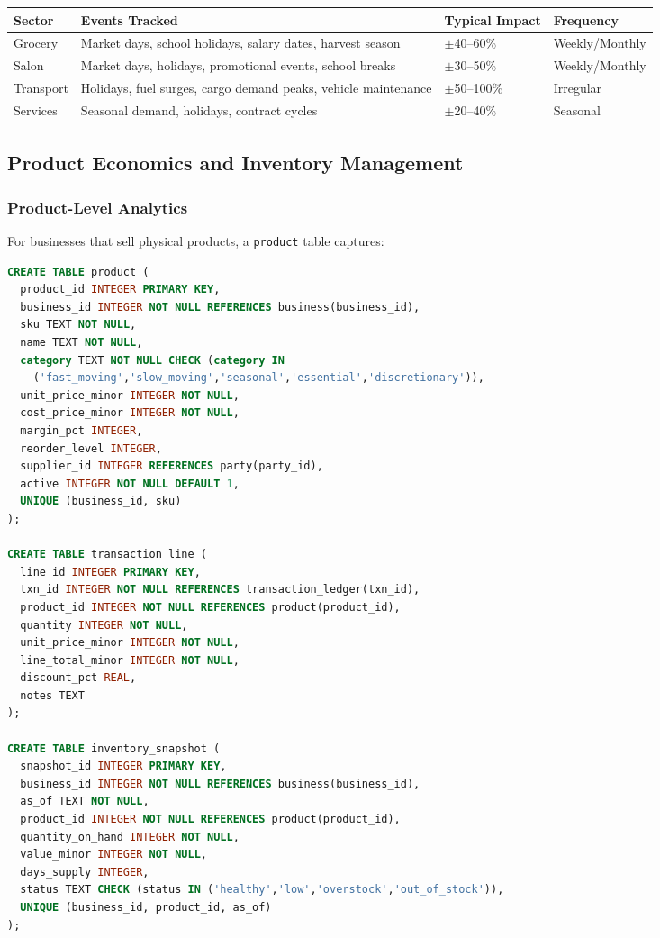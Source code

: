 \documentclass[10pt,a4paper]{article}
\newcommand{\code}[1]{\texttt{\small #1}}
\begin{document}
\begin{center}
\begin{tabularx}{\textwidth}{@{}p{2.8cm}p{4.4cm}p{3.6cm}p{2.0cm}@{}}
\toprule
\textbf{Sector} & \textbf{Events Tracked} & \textbf{Typical Impact} & \textbf{Frequency}\\
\midrule
Grocery & Market days, school holidays, salary dates, harvest season & $\pm$40--60\% & Weekly/Monthly\\
Salon & Market days, holidays, promotional events, school breaks & $\pm$30--50\% & Weekly/Monthly\\
Transport & Holidays, fuel surges, cargo demand peaks, vehicle maintenance & $\pm$50--100\% & Irregular\\
Services & Seasonal demand, holidays, contract cycles & $\pm$20--40\% & Seasonal\\
\bottomrule
\end{tabularx}
\end{center}

\subsection{Product Economics and Inventory Management}
\label{sec:products}

\subsubsection{Product-Level Analytics}

For businesses that sell physical products, a \code{product} table captures:

\begin{lstlisting}[language=SQL,caption={Product and inventory entities}]
CREATE TABLE product (
  product_id INTEGER PRIMARY KEY,
  business_id INTEGER NOT NULL REFERENCES business(business_id),
  sku TEXT NOT NULL,
  name TEXT NOT NULL,
  category TEXT NOT NULL CHECK (category IN 
    ('fast_moving','slow_moving','seasonal','essential','discretionary')),
  unit_price_minor INTEGER NOT NULL,
  cost_price_minor INTEGER NOT NULL,
  margin_pct INTEGER,
  reorder_level INTEGER,
  supplier_id INTEGER REFERENCES party(party_id),
  active INTEGER NOT NULL DEFAULT 1,
  UNIQUE (business_id, sku)
);

CREATE TABLE transaction_line (
  line_id INTEGER PRIMARY KEY,
  txn_id INTEGER NOT NULL REFERENCES transaction_ledger(txn_id),
  product_id INTEGER NOT NULL REFERENCES product(product_id),
  quantity INTEGER NOT NULL,
  unit_price_minor INTEGER NOT NULL,
  line_total_minor INTEGER NOT NULL,
  discount_pct REAL,
  notes TEXT
);

CREATE TABLE inventory_snapshot (
  snapshot_id INTEGER PRIMARY KEY,
  business_id INTEGER NOT NULL REFERENCES business(business_id),
  as_of TEXT NOT NULL,
  product_id INTEGER NOT NULL REFERENCES product(product_id),
  quantity_on_hand INTEGER NOT NULL,
  value_minor INTEGER NOT NULL,
  days_supply INTEGER,
  status TEXT CHECK (status IN ('healthy','low','overstock','out_of_stock')),
  UNIQUE (business_id, product_id, as_of)
);
\end{lstlisting}
\end{document}
